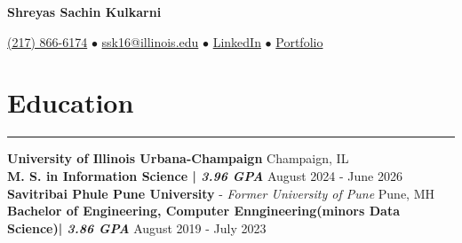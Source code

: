 \documentclass[10pt]{article}
\begin{document}
\begin{center}
\textbf{\Large Shreyas Sachin Kulkarni}
\end{center}
\begin{center}
\small
\href{tel:+12178666174}{(217) 866-6174} $\bullet$
\href{mailto:ssk16@illinois.edu}{ssk16@illinois.edu} $\bullet$
\href{https://www.linkedin.com/in/shreyaskulkarni29/}{LinkedIn} $\bullet$
\href{https://portfolio-shreyas-kulkarni.netlify.app/}{Portfolio}
\end{center}

\section*{Education}
\noindent
\rule{\textwidth}{0.4pt}
\textbf{University of Illinois Urbana-Champaign } \hfill Champaign, IL \\
\textbf{{M. S. in Information Science | \emph{3.96 GPA}}} \hfill August 2024 - June 2026\\[4pt]
\noindent
\textbf{Savitribai Phule Pune University} - \textit{Former University of Pune} \hfill  Pune, MH \\
\textbf{{Bachelor of Engineering, Computer Enngineering(minors Data Science)| \emph{3.86 GPA}}} \hfill August 2019 - July 2023\\
\end{document}
